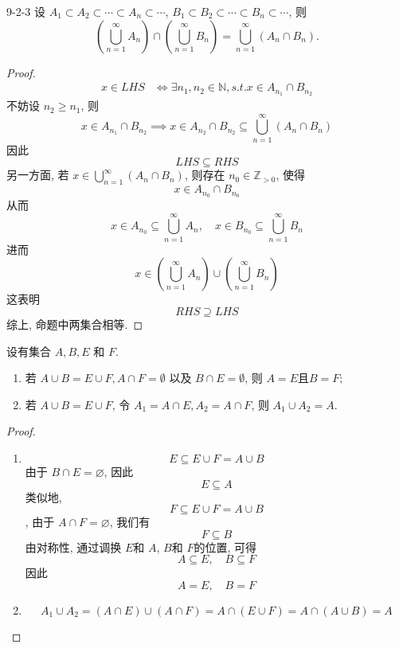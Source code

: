 \documentclass[../main.tex]{subfiles}
\begin{document}
\begin{exercise}{}{9-2-3}
    设 $A_1 \subset A_2 \subset \cdots \subset A_n \subset \cdots$, $B_1 \subset B_2 \subset \cdots \subset B_n \subset \cdots$, 则
\[ \left( \bigcup_{n=1}^{\infty} A_n \right) \cap \left( \bigcup_{n=1}^{\infty} B_n \right) = \bigcup_{n=1}^{\infty} (A_n \cap B_n). \]
\end{exercise}
\begin{proof}
    \[
    \begin{aligned}
    x\in LHS&\iff \exists n_1,n_2\in \mathbb{N} , s.t. x\in A_{n_1}\cap B_{n_2} 
    \end{aligned}
    \] 不妨设 \(  n_2\ge n_1  \), 则\[
    x \in A_{n_1}\cap B_{n_2}\implies  x \in A_{n_2}\cap B_{n_2}\subseteq \bigcup _{n = 1}^{\infty}\left( A_{n}\cap B_{n} \right) 
    \] 因此 \[
    LHS \subseteq RHS
    \] 另一方面, 若 \(  x \in \bigcup _{n = 1}^{\infty}\left( A_{n}\cap B_{n} \right)   \), 则存在 \(  n_0\in \mathbb{Z} _{> 0}  \), 使得 \[
    x\in A_{n_0}\cap B_{n_0}
    \]从而 \[
    x \in A_{n_0}\subseteq \bigcup _{n = 1}^{\infty}A_{n},\quad x\in B_{n_0}\subseteq \bigcup _{n = 1}^{\infty}B_{n}
    \]进而 \[
    x \in \left( \bigcup _{n = 1}^{\infty}A_{n} \right)\cup \left( \bigcup  _{n =  1}^{\infty}B_{n}  \right) 
    \]  这表明 \[
    RHS\supseteq LHS
    \]综上, 命题中两集合相等.
\end{proof}

\begin{exercise}{}{}
    设有集合 $A,B,E$ 和 $F$.
\begin{enumerate}
\item[(i)] 若 $A \cup B = E \cup F, A \cap F = \emptyset$ 以及 $B \cap E = \emptyset$, 则
$A = E \text{且} B = F;$
\item[(ii)] 若 $A \cup B = E \cup F$, 令 $A_1 = A \cap E, A_2 = A \cap F$, 则
$A_1 \cup A_2 = A.$
\end{enumerate}
\end{exercise}

 \begin{proof}
 \begin{enumerate}
    \item[(i)]  \[
  E\subseteq  E\cup F= A\cup B
  \] 由于 \(  B\cap E= \varnothing  \), 因此 \[
  E\subseteq  A
  \] 类似地, \[
  F\subseteq E\cup F= A\cup B
  \], 由于 \(  A\cap F= \varnothing  \), 我们有 \[
  F\subseteq B
  \] 由对称性, 通过调换 \(  E  \)和 \(  A  \), \(  B  \)和 \(  F  \)的位置, 可得 \[
  A\subseteq E,\quad B\subseteq F
  \]   因此 \[
  A= E,\quad B= F
  \]
  \item[(ii)]  \[
  A_1\cup A_2= \left( A\cap E \right)\cup \left( A\cap F \right)= A\cap \left( E\cup F \right)= A\cap \left( A\cup B \right)= A    
  \]
 \end{enumerate}
 
 \end{proof}
\end{document}
